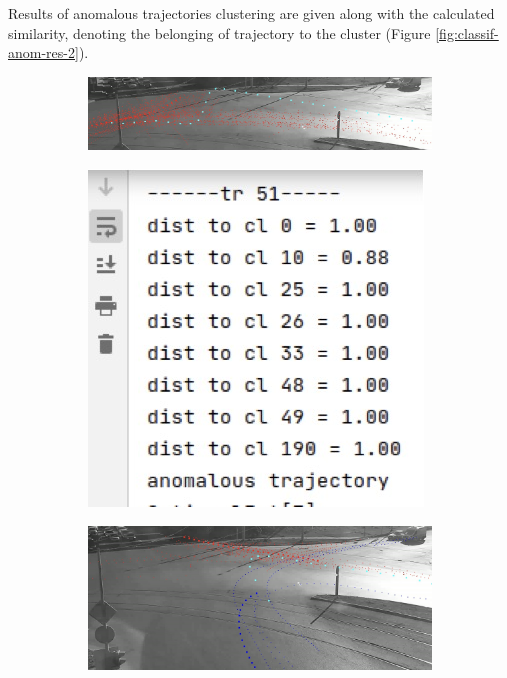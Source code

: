 Results of anomalous trajectories clustering are given along with the calculated 
similarity, denoting the belonging of trajectory to the cluster (Figure \ref{fig:classif-anom-res-2}).

\begin{figure}[htb!]
	\centering
	\begin{subfigure}[!htb]{0.70\textwidth}
		\centering{}
		\includegraphics[width=\textwidth]{images/classif-res/classif-anom-res-2-1.jpeg}
		\caption{}
	\end{subfigure}
	\hfill
	\begin{subfigure}[!htb]{0.28\textwidth}
		\centering{}
		\includegraphics[width=\textwidth]{images/classif-res/classif-anom-res-2-1-stat.jpeg}
		\caption{}
	\end{subfigure}
	\hfill
	\begin{subfigure}[!htb]{0.70\textwidth}
		\centering{}
		\includegraphics[width=\textwidth]{images/classif-res/classif-anom-res-2-2.jpeg}

\end{subfigure}
\end{figure}
